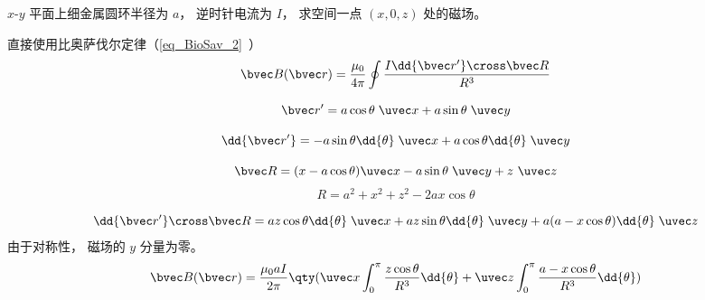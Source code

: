 
\begin{issues}
\issueDraft
\end{issues}


$x$-$y$ 平面上细金属圆环半径为 $a$， 逆时针电流为 $I$， 求空间一点 $(x, 0, z)$ 处的磁场。

直接使用比奥萨伐尔定律（\autoref{eq_BioSav_2}~）
\begin{equation}
\bvec B(\bvec r) = \frac{\mu_0}{4\pi} \oint \frac{I \dd{\bvec r'} \cross \bvec R}{R^3}
\end{equation}

\begin{equation}
\bvec r' = a\cos\theta\; \uvec x + a\sin\theta\; \uvec y
\end{equation}

\begin{equation}
\dd{\bvec r'} = -a\sin \theta \dd{\theta}\; \uvec x + a\cos \theta \dd{\theta}\; \uvec y
\end{equation}

\begin{equation}
\bvec R = (x - a\cos\theta)\uvec x - a\sin\theta \;\uvec y+ z\ \uvec z
\end{equation}
\begin{equation}
R = a^2 + x^2 + z^2 - 2ax\cos\theta
\end{equation}

\begin{equation}
\dd{\bvec r'} \cross \bvec R = az \cos\theta \dd{\theta} \;\uvec x + az\sin\theta \dd{\theta} \;\uvec y + a(a - x\cos\theta)\dd{\theta}\;\uvec z
\end{equation}
由于对称性， 磁场的 $y$ 分量为零。
\begin{equation}
\bvec B(\bvec r) = \frac{\mu_0 a I}{2\pi} \qty(\uvec x\int_0^\pi \frac{z \cos\theta}{R^3} \dd{\theta} + \uvec z\int_0^\pi \frac{a - x\cos\theta}{R^3} \dd{\theta})
\end{equation}
